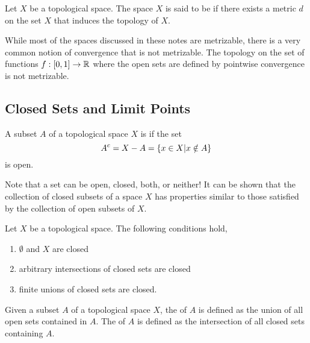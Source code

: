 \begin{definition}
Let $X$ be a topological space.
The space $X$ is said to be  if there exists a metric $d$ on the set $X$ that induces the topology of $X$.
\end{definition}

\begin{example}
While most of the spaces discussed in these notes are metrizable, there is a very common notion of convergence that is not metrizable.
The topology on the set of functions $f: [0,1]\rightarrow \mathbb{R}$ where the open sets are defined by pointwise convergence is not metrizable.
\end{example}


\subsection{Closed Sets and Limit Points}

\begin{definition}
A subset $A$ of a topological space $X$ is  if the set
\begin{equation*}
{A}^{c} = X - A = \{ x \in X | x \notin A \}
\end{equation*}
is open.
\end{definition}

Note that a set can be open, closed, both, or neither!
It can be shown that the collection of closed subsets of a space $X$ has properties similar to those satisfied by the collection of open subsets of $X$.

\begin{fact}
Let $X$ be a topological space.
The following conditions hold,
\begin{enumerate}
\item $\emptyset$ and $X$ are closed
\item arbitrary intersections of closed sets are closed
\item finite unions of closed sets are closed.
\end{enumerate}
\end{fact}

\begin{definition}
Given a subset $A$ of a topological space $X$, the  of $A$ is defined as the union of all open sets contained in $A$.
The  of $A$ is defined as the intersection of all closed sets containing $A$.
\end{definition}

